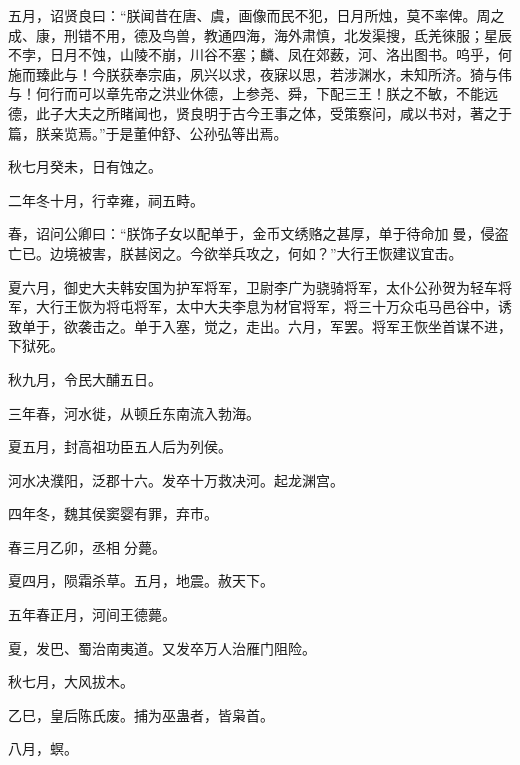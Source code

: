 \documentclass[12pt,UTF8]{ctexbook}
\begin{document}
五月，诏贤良曰：“朕闻昔在唐、虞，画像而民不犯，日月所烛，莫不率俾。周之成、康，刑错不用，德及鸟兽，教通四海，海外肃慎，北发渠搜，氐羌徠服；星辰不孛，日月不蚀，山陵不崩，川谷不塞；麟、凤在郊薮，河、洛出图书。呜乎，何施而臻此与！今朕获奉宗庙，夙兴以求，夜寐以思，若涉渊水，未知所济。猗与伟与！何行而可以章先帝之洪业休德，上参尧、舜，下配三王！朕之不敏，不能远德，此子大夫之所睹闻也，贤良明于古今王事之体，受策察问，咸以书对，著之于篇，朕亲览焉。”于是董仲舒、公孙弘等出焉。



秋七月癸未，日有蚀之。



二年冬十月，行幸雍，祠五畤。



春，诏问公卿曰：“朕饰子女以配单于，金币文绣赂之甚厚，单于待命加曼，侵盗亡已。边境被害，朕甚闵之。今欲举兵攻之，何如？”大行王恢建议宜击。



夏六月，御史大夫韩安国为护军将军，卫尉李广为骁骑将军，太仆公孙贺为轻车将军，大行王恢为将屯将军，太中大夫李息为材官将军，将三十万众屯马邑谷中，诱致单于，欲袭击之。单于入塞，觉之，走出。六月，军罢。将军王恢坐首谋不进，下狱死。



秋九月，令民大酺五日。



三年春，河水徙，从顿丘东南流入勃海。



夏五月，封高祖功臣五人后为列侯。



河水决濮阳，泛郡十六。发卒十万救决河。起龙渊宫。



四年冬，魏其侯窦婴有罪，弃市。



春三月乙卯，丞相分薨。



夏四月，陨霜杀草。五月，地震。赦天下。



五年春正月，河间王德薨。



夏，发巴、蜀治南夷道。又发卒万人治雁门阻险。



秋七月，大风拔木。



乙巳，皇后陈氏废。捕为巫蛊者，皆枭首。



八月，螟。
\end{document}
